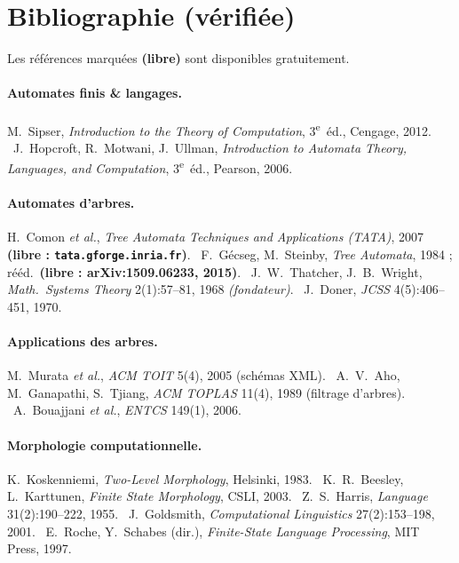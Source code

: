 \documentclass[11pt,a4paper]{scrartcl}
\begin{document}
\section{Bibliographie (vérifiée)}
Les références marquées \textbf{(libre)} sont disponibles gratuitement.

\paragraph{Automates finis \& langages.} M.~Sipser, \emph{Introduction to the Theory of
Computation}, 3\textsuperscript{e}~éd., Cengage, 2012. \textbullet\ J.~Hopcroft, R.~Motwani,
J.~Ullman, \emph{Introduction to Automata Theory, Languages, and Computation},
3\textsuperscript{e}~éd., Pearson, 2006.

\paragraph{Automates d'arbres.} H.~Comon \emph{et al.}, \emph{Tree Automata Techniques and
Applications (TATA)}, 2007 \textbf{(libre : \texttt{tata.gforge.inria.fr})}. \textbullet\
F.~Gécseg, M.~Steinby, \emph{Tree Automata}, 1984 ; rééd.\ \textbf{(libre : arXiv:1509.06233,
2015)}. \textbullet\ J.~W.~Thatcher, J.~B.~Wright, \emph{Math.\ Systems Theory} 2(1):57–81,
1968 \emph{(fondateur)}. \textbullet\ J.~Doner, \emph{JCSS} 4(5):406–451, 1970.

\paragraph{Applications des arbres.} M.~Murata \emph{et al.}, \emph{ACM TOIT} 5(4), 2005
(schémas XML). \textbullet\ A.~V.~Aho, M.~Ganapathi, S.~Tjiang, \emph{ACM TOPLAS} 11(4),
1989 (filtrage d'arbres). \textbullet\ A.~Bouajjani \emph{et al.}, \emph{ENTCS} 149(1), 2006.

\paragraph{Morphologie computationnelle.} K.~Koskenniemi, \emph{Two-Level Morphology},
Helsinki, 1983. \textbullet\ K.~R.~Beesley, L.~Karttunen, \emph{Finite State Morphology},
CSLI, 2003. \textbullet\ Z.~S.~Harris, \emph{Language} 31(2):190–222, 1955. \textbullet\
J.~Goldsmith, \emph{Computational Linguistics} 27(2):153–198, 2001. \textbullet\ E.~Roche,
Y.~Schabes (dir.), \emph{Finite-State Language Processing}, MIT Press, 1997.
\end{document}
